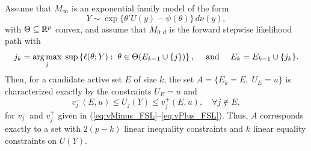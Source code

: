 \documentclass{article}
\begin{document}
\begin{theorem}
  Assume that $M_\infty$ is an exponential family model
  of the form
  \[
  Y \sim \exp\{ \theta'U(y) - \psi(\theta) \}\,d\nu(y),
  \]
  with $\Theta \subseteq \mathbb{R}^p$ convex, and assume that $M_{0:d}$ is the forward stepwise likelihood path with
\begin{equation}
j_k = \operatorname*{arg\,max}_j \;\sup \left\{\ell(\theta; Y):\; \theta\in\Theta(E_{k-1} \cup \{j\})\right\}, \quad \text{ and } \quad
E_k = E_{k-1} \cup \{j_k\}.
\end{equation}
  Then, for a candidate active set $E$ of size $k$, the set $A = \{E_k = E, \;U_E = u\}$ is characterized exactly by the constraints $U_E = u$ and
  \[
  v_j^-(E,u) \leq U_j(Y) \leq v_j^+(E,u), \quad\forall j \notin E,
  \]
  for $v_j^-$ and $v_j^+$ given in (\ref{eq:vMinus_FSL}--\ref{eq:vPlus_FSL}). Thus, $A$ corresponds exactly to a set with $2(p-k)$ linear inequality constraints and $k$ linear equality constraints on $U(Y)$.
\end{theorem}
\end{document}

